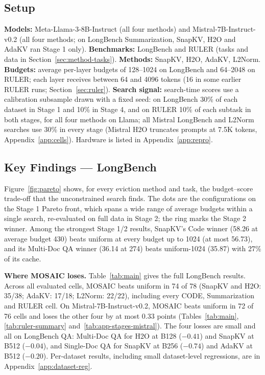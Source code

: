 \documentclass[11pt]{article}
\begin{document}
\subsection{Setup}

\textbf{Models:} Meta-Llama-3-8B-Instruct (all four methods) and Mistral-7B-Instruct-v0.2 (all four methods; on LongBench Summarization, SnapKV, H2O and AdaKV ran Stage 1 only). \textbf{Benchmarks:} LongBench and RULER (tasks and data in Section~\ref{sec:method-tasks}). \textbf{Methods:} SnapKV, H2O, AdaKV, L2Norm. \textbf{Budgets:} average per-layer budgets of 128--1024 on LongBench and 64--2048 on RULER; each layer receives between 64 and 4096 tokens (16 in some earlier RULER runs; Section~\ref{sec:ruler}). \textbf{Search signal:} search-time scores use a calibration subsample drawn with a fixed seed: on LongBench 30\% of each dataset in Stage 1 and 10\% in Stage 4, and on RULER 10\% of each subtask in both stages, for all four methods on Llama; all Mistral LongBench and L2Norm searches use 30\% in every stage (Mistral H2O truncates prompts at 7.5K tokens, Appendix~\ref{app:cells}). Hardware is listed in Appendix~\ref{app:repro}.





\subsection{Key Findings — LongBench}
\label{sec:which-stage}

Figure~\ref{fig:pareto} shows, for every eviction method and task, the budget--score trade-off that the unconstrained search finds. The dots are the configurations on the Stage 1 Pareto front, which spans a wide range of average budgets within a single search, re-evaluated on full data in Stage 2; the ring marks the Stage 2 winner. Among the strongest Stage 1/2 results, SnapKV's Code winner (58.26 at average budget 430) beats uniform at every budget up to 1024 (at most 56.73), and its Multi-Doc QA winner (36.14 at 274) beats uniform-1024 (35.87) with 27\% of its cache.

\textbf{Where MOSAIC loses.} Table~\ref{tab:main} gives the full LongBench results. Across all evaluated cells, MOSAIC beats uniform in 74 of 78 (SnapKV and H2O: 35/38; AdaKV: 17/18; L2Norm: 22/22), including every CODE, Summarization and RULER cell. On Mistral-7B-Instruct-v0.2, MOSAIC beats uniform in 72 of 76 cells and loses the other four by at most 0.33 points (Tables~\ref{tab:main}, \ref{tab:ruler-summary} and~\ref{tab:app-stages-mistral}). The four losses are small and all on LongBench QA: Multi-Doc QA for H2O at B128 ($-0.41$) and SnapKV at B512 ($-0.04$), and Single-Doc QA for SnapKV at B256 ($-0.74$) and AdaKV at B512 ($-0.20$). Per-dataset results, including small dataset-level regressions, are in Appendix~\ref{app:dataset-reg}.
\end{document}
